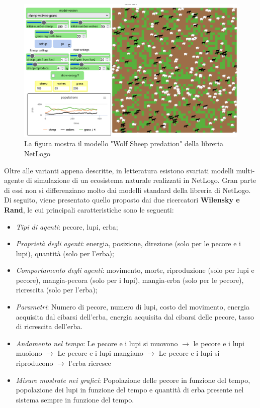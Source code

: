 \documentclass[11pt]{article}
\begin{document}
\begin{figure}[h]
    \centering
    \includegraphics[scale = 0.5]{modelloNetLogo.png}
    \caption{La figura mostra il modello "Wolf Sheep predation" della libreria NetLogo}
    \label{fig:ModelloNetLogo}
\end{figure}

Oltre alle varianti appena descritte, in letteratura esistono svariati modelli multi-agente di simulazione di un ecosistema naturale realizzati in NetLogo. Gran parte di essi non si differenziano molto dai modelli standard della libreria di NetLogo. Di seguito, viene presentato quello proposto dai due ricercatori \textbf{Wilensky e Rand}\cite{WilenskyRand}, le cui principali caratteristiche sono le seguenti: 

\begin{itemize}
    \item \emph{Tipi di agenti}: pecore, lupi, erba;
    \item \emph{Proprietà degli agenti}: energia, posizione, direzione (solo per le pecore e i lupi), quantità (solo per l'erba);
    \item \emph{Comportamento degli agenti}: movimento, morte, riproduzione (solo per lupi e pecore), mangia-pecora (solo per i lupi), mangia-erba (solo per le pecore), ricrescita (solo per l'erba);
    \item \emph{Parametri}: Numero di pecore, numero di lupi, costo del movimento, energia acquisita dal cibarsi dell'erba, energia acquisita dal cibarsi delle pecore, tasso di ricrescita dell'erba.
    \item \emph{Andamento nel tempo}: Le pecore e i lupi si muovono $\rightarrow$ le pecore e i lupi muoiono $\rightarrow$ Le pecore e i lupi mangiano $\rightarrow$ Le pecore e i lupi si riproducono $\rightarrow$ l'erba ricresce
    \item \emph{Misure mostrate nei grafici}: Popolazione delle pecore in funzione del tempo, popolazione dei lupi in funzione del tempo e quantità di erba presente nel sistema sempre in funzione del tempo. 
\end{itemize}
\end{document}
